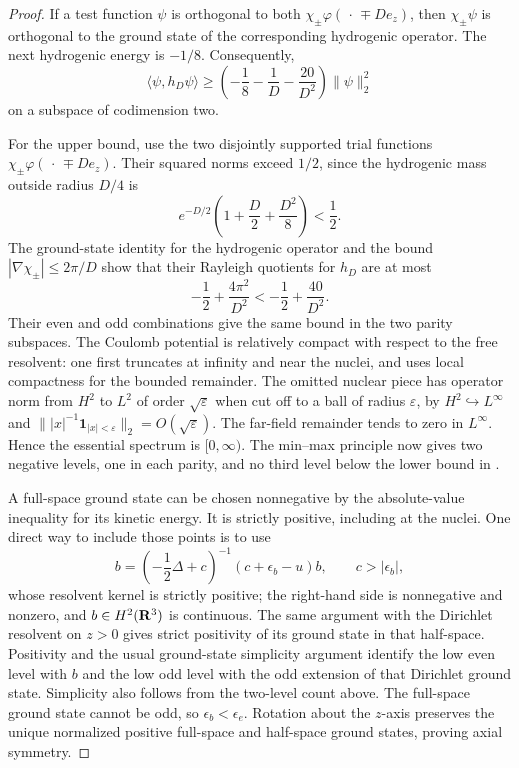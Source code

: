 \begin{proof}
If a test function \(\psi\) is orthogonal to both
\(\chi_\pm\varphi(\,\cdot\,\mp De_z)\), then
\(\chi_\pm\psi\) is orthogonal to the ground state of the corresponding
hydrogenic operator.  The next hydrogenic energy is \(-1/8\).
Consequently,
\begin{equation}
 \langle\psi,h_D\psi\rangle
 \ge\left(-\frac18-\frac1D-\frac{20}{D^2}\right)\|\psi\|_2^2
 \label{eq:two-centre-third-lower}
\end{equation}
on a subspace of codimension two.

For the upper bound, use the two disjointly supported trial functions
\(\chi_\pm\varphi(\,\cdot\,\mp De_z)\).  Their squared norms exceed
\(1/2\), since the hydrogenic mass outside radius \(D/4\) is
\[
 e^{-D/2}\left(1+\frac D2+\frac{D^2}{8}\right)<\frac12.
\]
The ground-state identity for the hydrogenic operator and the bound
\(|\nabla\chi_\pm|\le2\pi/D\) show that their Rayleigh quotients for
\(h_D\) are at most
\begin{equation}
 -\frac12+\frac{4\pi^2}{D^2}
 <-\frac12+\frac{40}{D^2}.
 \label{eq:two-centre-two-upper}
\end{equation}
Their even and odd combinations give the same bound in the two
parity subspaces.  The Coulomb potential is relatively compact with
respect to the free resolvent: one first truncates at infinity and
near the nuclei, and uses local compactness for the bounded remainder.
The omitted nuclear piece has operator norm from \(H^2\) to \(L^2\)
of order \(\sqrt{\varepsilon}\) when cut off to a ball of radius
\(\varepsilon\), by \(H^2\hookrightarrow L^\infty\) and
\(\||x|^{-1}\mathbf 1_{|x|<\varepsilon}\|_2=O(\sqrt\varepsilon)\).
The far-field remainder tends to zero in \(L^\infty\).
Hence the essential spectrum is \([0,\infty)\).
The min--max principle now gives two negative levels, one in each
parity, and no third level below the lower bound in
.

A full-space ground state can be chosen nonnegative by the
absolute-value inequality for its kinetic energy.  It is strictly
positive, including at the nuclei.  One direct way to include those
points is to use
\[
 b=\left(-\frac12\Delta+c\right)^{-1}
       (c+\epsilon_b-u)b,\qquad c>|\epsilon_b|,
\]
whose resolvent kernel is strictly positive; the right-hand side is
nonnegative and nonzero, and \(b\in H^2(\mathbf R^3)\) is continuous.
The same argument with the Dirichlet resolvent on \(z>0\) gives
strict positivity of its ground state in that half-space.
Positivity and the usual ground-state simplicity argument identify
the low even level with \(b\) and the low odd level with the odd
extension of that Dirichlet ground state.  Simplicity also follows
from the two-level count above.  The full-space ground state cannot
be odd, so \(\epsilon_b<\epsilon_e\).  Rotation about the \(z\)-axis
preserves the unique normalized positive full-space and half-space
ground states, proving axial symmetry.


\end{proof}
